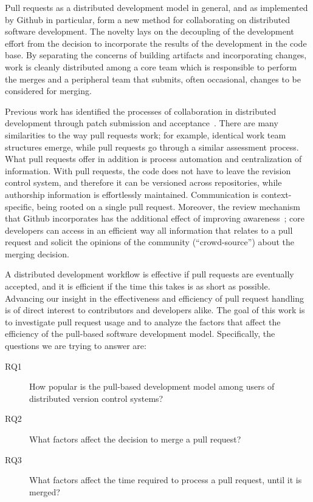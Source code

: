 \documentclass{sig-alternate}
\begin{document}
Pull requests as a distributed development model
in general, and as implemented by Github in particular,
form a new method for collaborating on distributed software development. The
novelty lays on the decoupling of the development effort from the decision to
incorporate the results of the development in the code base. By separating the
concerns of building artifacts and incorporating changes, work is cleanly
distributed among a core team which is responsible to perform the merges and a
peripheral team that submits, often occasional, changes to be considered for
merging.

Previous work has identified the processes of collaboration in
distributed development through patch submission and acceptance~\cite{MOCKU02,
Bird07, Weiss08}. There are many similarities to the way pull requests work; for
example, identical work team structures emerge, 
while pull requests go through a similar assessment
process. What pull requests offer in addition is process automation and
centralization of information. With pull requests, the code does not have to
leave the revision control system, and therefore it can be versioned across
repositories, while authorship information is effortlessly maintained.
Communication is context-specific, being rooted on a single pull request.
Moreover, the review mechanism that Github incorporates has the additional
effect of improving awareness~\cite{Dabbi12}; core developers can access in an
efficient way all information that relates to a pull request and solicit the
opinions of the community (``crowd-source'') about the merging decision.

A distributed development workflow is effective if
pull requests are eventually accepted, and it is efficient if the time this
takes is as short as possible. Advancing our insight in the effectiveness and
efficiency of pull request handling is of direct interest to contributors 
and developers alike.
The goal of this work is to investigate pull request usage and to analyze the
factors that affect the efficiency of the pull-based software development model.
Specifically, the questions we are trying to answer are: 

\begin{description}

  \item[RQ1] How popular is the pull-based development model among users of distributed version control systems?

  \item[RQ2] What factors affect the decision to merge a pull request?

  \item[RQ3] What factors affect the time required to process a pull request,
    until it is merged?

\end{description}
\end{document}
